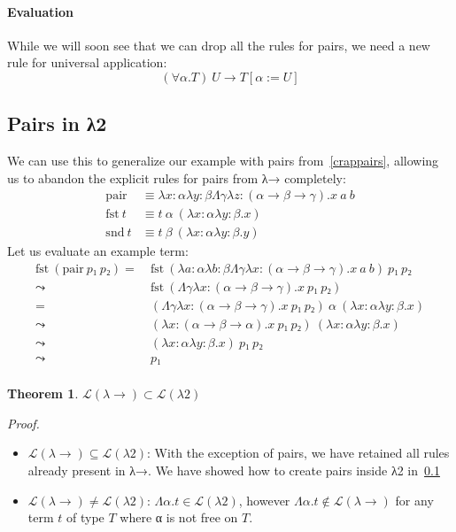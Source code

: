 \documentclass[12pt]{article}
\newtheorem{theorem}{Theorem}
\begin{document}
\paragraph{Evaluation}
While we will soon see that we can drop all the rules for pairs, we need a new rule for universal application:
\[(∀α.T) \ U → T[α:=U]\]

\subsection{Pairs in λ2}
\label{pairs}
We can use this to generalize our example with pairs from~\ref{crappairs}, allowing us to abandon the explicit rules for pairs from λ→ completely:
\begin{align*}
    \mathrm{pair} &≡ λx:αλy:βΛγλz:(α → β → γ).x \ a \ b\\
    \mathrm{fst} \ t &≡ t \ α \ (λx:αλy:β.x)\\
    \mathrm{snd} \ t &≡ t \ β \ (λx:αλy:β.y)
\end{align*}
Let us evaluate an example term:
\begin{align*}
    \mathrm{fst} \ (\mathrm{pair} \ p₁ \ p₂) =& \ \mathrm{fst} \ (λa:αλb:βΛγλx:(α → β → γ).x \ a \ b) \ p₁ \ p₂\\
    \leadsto& \ \mathrm{fst} \ (Λγλx:(α → β → γ).x \ p₁ \ p₂)\\
    =& \ (Λγλx:(α → β → γ).x \ p₁ \ p₂) \ α \ (λx:αλy:β.x)\\
    \leadsto& \ (λx:(α → β → α).x \ p₁ \ p₂) \ (λx:αλy:β.x)\\
    \leadsto& \ (λx:αλy:β.x) \ p₁ \ p₂\\
    \leadsto& \ p₁\\
\end{align*}

\begin{theorem}
    $\mathcal{L}(λ→) ⊂ \mathcal{L}(λ2)$
\end{theorem}
\noindent\textit{Proof.}
\begin{itemize}
    \item $\mathcal{L}(λ→) ⊆ \mathcal{L}(λ2)$: With the exception of pairs, we have retained all rules already present in λ→. We have showed how to create pairs inside λ2 in~\ref{pairs}
    \item $\mathcal{L}(λ→) ≠ \mathcal{L}(λ2)$: $Λα.t ∈ \mathcal{L}(λ2)$, however $Λα.t ∉ \mathcal{L}(λ→)$ for any term $t$ of type $T$ where α is not free on $T$.
\end{itemize}
\end{document}

